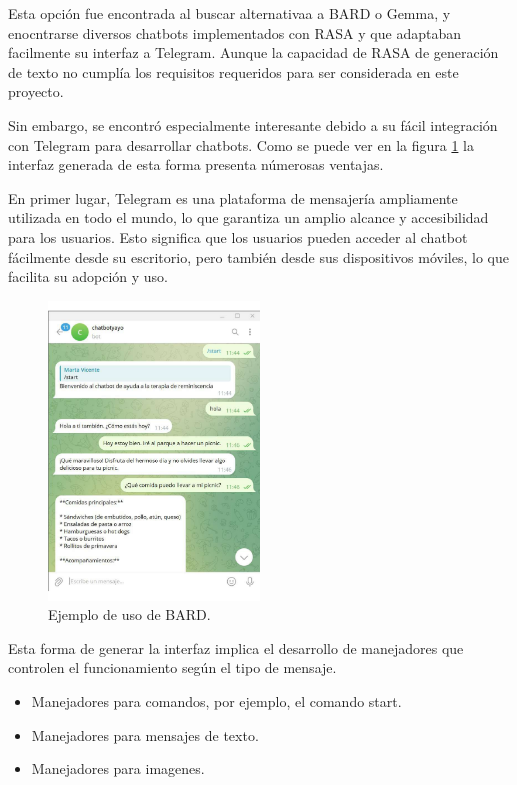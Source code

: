 Esta opción fue encontrada al buscar alternativaa a BARD o Gemma, y enocntrarse diversos chatbots implementados con RASA y que adaptaban facilmente su interfaz a Telegram. Aunque la capacidad de RASA de generación de texto no cumplía los requisitos requeridos para ser considerada en este proyecto. 

Sin embargo, se encontró especialmente interesante debido a su fácil integración con Telegram para desarrollar chatbots. Como se puede ver en la figura \ref{fig:ejemploRASATELEGRAM} la interfaz generada de esta forma presenta númerosas ventajas. 

En primer lugar, Telegram es una plataforma de mensajería ampliamente utilizada en todo el mundo, lo que garantiza un amplio alcance y accesibilidad para los usuarios. Esto significa que los usuarios pueden acceder al chatbot fácilmente desde su escritorio, pero también desde sus dispositivos móviles, lo que facilita su adopción y uso.

\begin{figure}[h]
	\centering
	\includegraphics[width=0.5\textwidth]{Imagenes/telegram1}
	\caption{ Ejemplo de uso de BARD.}
	\label{fig:ejemploRASATELEGRAM}
\end{figure}

Esta forma de generar la interfaz implica el desarrollo de manejadores que controlen el funcionamiento según el tipo de mensaje. 
	
\begin{itemize}
	\item Manejadores para comandos, por ejemplo, el comando start.
	
	\item Manejadores para mensajes de texto.
	
	\item Manejadores para imagenes. 
\end{itemize}
	
